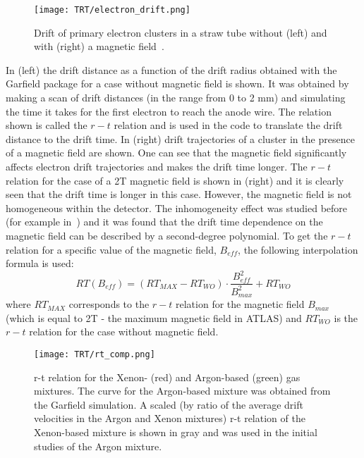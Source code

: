 \begin{figure}
\begin{center}
 \texttt{[image: TRT/electron\_drift.png]}
\caption {Drift of primary electron clusters in a straw tube without (left) and with (right) a magnetic field~\cite{cwetanski_thesis}. 
}
\label{fig:clusterDriftInTube}
\end{center}
\end{figure}

In  (left) the drift distance as a function of the drift radius obtained with the Garfield package for a case without magnetic field is shown.
It was obtained by making a scan of drift distances (in the range from 0 to 2 mm) and simulating the time it takes for the first electron to reach the anode wire.
The relation shown is called the $r-t$ relation and is used in the code to translate the drift distance to the drift time.
In  (right) drift trajectories of a cluster in the presence of a magnetic field are shown. One can see that the magnetic field
significantly affects electron drift trajectories and makes the drift time longer. The $r-t$ relation for the case of a 2T magnetic field is shown
in  (right) and it is clearly seen that the drift time is longer in this case. However, the magnetic field is not homogeneous within the detector.
The inhomogeneity effect was studied before (for example in~\cite{esben_thesis}) and it was found that the drift time dependence on the magnetic field can be described by a second-degree polynomial. 
To get the $r-t$ relation for a specific value of the magnetic field, $B_{eff}$, the following interpolation formula is used:
\begin{displaymath}
    RT(B_{eff}) = (RT_{MAX} - RT_{WO}) \cdot \dfrac{B_{eff}^2}{B_{max}^2} + RT_{WO}
\end{displaymath}
where $RT_{MAX}$ corresponds to the $r-t$ relation for the magnetic field $B_{max}$ (which is equal to 2T - the maximum magnetic field in ATLAS) and $RT_{WO}$ is the 
$r-t$ relation for the case without magnetic field.

\begin{figure}
\centering
 \texttt{[image: TRT/rt\_comp.png]}
\caption{r-t relation for the Xenon- (red) and Argon-based (green) gas mixtures. The curve for the Argon-based mixture was obtained from the Garfield simulation. 
A scaled (by ratio of the average drift velocities in the Argon and Xenon mixtures) 
r-t relation of the Xenon-based mixture is shown in gray and was used in the initial studies of the Argon mixture.
}
\label{fig:rt_comp}
\end{figure}


